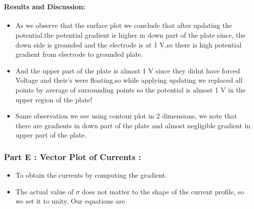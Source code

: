 \documentclass[11pt]{article}
\providecommand{\tightlist}{%
      \setlength{\itemsep}{0pt}\setlength{\parskip}{0pt}}
\begin{document}
	

	

    \begin{center}
    \end{center}
    { \hspace*{\fill} \\}
    
	
		
    \paragraph{Results and Discussion:}\label{results-and-discussion}

\begin{itemize}
\tightlist
\item
  As we observe that the surface plot we conclude that after updating
  the potential,the potential gradient is higher in down part of the
  plate since, the down side is grounded and the electrode is at 1 V,so
  there is high potential gradient from electrode to grounded plate.
\item
  And the upper part of the plate is almost 1 V since they didnt have
  forced Voltage and their's were floating,so while applying updating we
  replaced all points by average of surrounding points so the potential
  is almost 1 V in the upper region of the plate!
\item
  Same observation we see using contour plot in 2 dimensions, we note
  that there are gradients in down part of the plate and almost
  negligible gradient in upper part of the plate.
\end{itemize}

	

	
		
    \subsubsection{Part E : Vector Plot of Currents
:}\label{part-e-vector-plot-of-currents}

\begin{itemize}
\tightlist
\item
  To obtain the currents by computing the gradient.
\item
  The actual value of \(\sigma\) does not matter to the shape of the
  current profile, so we set it to unity. Our equations are
\end{itemize}
\end{document}
